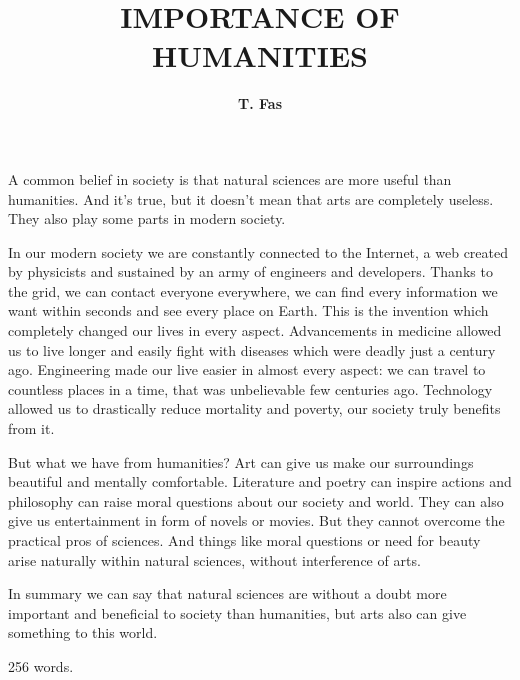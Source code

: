 \documentclass[12pt,a4paper]{article}
\author{\textbf{T. Fas}}
\title{\textbf{IMPORTANCE OF HUMANITIES}}
\begin{document}
\maketitle


A common belief in society is that natural sciences are more useful than humanities. And it's true, but it doesn't mean that arts are completely useless. They also play some parts in modern society.

	In our modern society we are constantly connected to the Internet, a web created by physicists and sustained by an army of engineers and developers. Thanks to the grid, we can contact everyone everywhere, we can find every information we want within seconds and see every place on Earth. This is the invention which completely changed our lives in every aspect. Advancements in medicine allowed us to live longer and easily fight with diseases which were deadly just a century ago. Engineering made our live easier in almost every aspect: we can travel to countless places in a time, that was unbelievable few centuries ago. Technology allowed us to drastically reduce mortality and poverty, our society truly benefits from it. 
	
	But what we have from humanities? Art can give us make our surroundings beautiful and mentally comfortable. Literature and poetry can inspire actions and philosophy can raise moral questions about our society and world. They can also give us entertainment in form of novels or movies. But they cannot overcome the practical pros of sciences. And things like moral questions or need for beauty arise naturally within natural sciences, without interference of arts. 
	
	In summary we can say that natural sciences are without a doubt more important and beneficial to society than humanities, but arts also can give something to this world.
	
	\vfill
	
	256 words.
	
	
	
\end{document}
